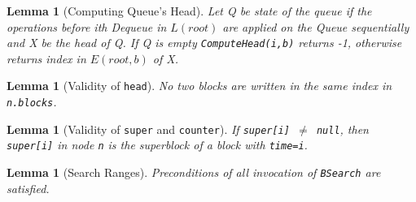 \documentclass[10pt]{article}
\renewcommand{\tt}[1]{\texttt{#1}}
\newtheorem{lemma}[theorem]{Lemma}
\theoremstyle{definition}
\begin{document}
\begin{lemma}[Computing Queue's Head] \label{computeHead}
  Let Q be state of the queue if the operations before ith Dequeue in $L(root)$ are applied on the Queue sequentially and X be the head of Q. If Q is empty \tt{ComputeHead(i,b)} returns -1, otherwise
 returns index in $E(root,b)$ of X.
  \end{lemma}

\begin{lemma}[Validity of \tt{head}]\label{head}
No two blocks are written in the same index in \tt{n.blocks}.
\end{lemma}

\begin{lemma}[Validity of \tt{super} and \tt{counter}]\label{superCounter}
If \tt{super[i] $\neq$ null}, then \tt{super[i]} in node \tt{n} is the superblock of a block with \tt{time=i}.
\end{lemma}

\begin{lemma}[Search Ranges]\label{search}
  Preconditions of all invocation of \tt{BSearch} are satisfied.
\end{lemma}
%  
%
%
%
\end{document}
